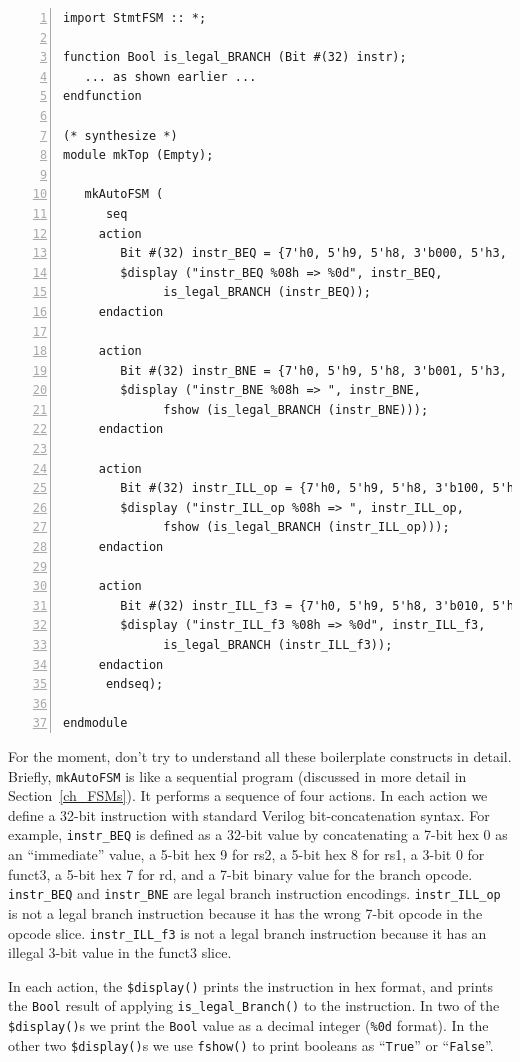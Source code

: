 \begin{minipage}{6.5in}\small
\begin{Verbatim}[frame=single, numbers=left]
import StmtFSM :: *;

function Bool is_legal_BRANCH (Bit #(32) instr);
   ... as shown earlier ...
endfunction

(* synthesize *)
module mkTop (Empty);

   mkAutoFSM (
      seq
	 action
	    Bit #(32) instr_BEQ = {7'h0, 5'h9, 5'h8, 3'b000, 5'h3, 7'b_110_0011};
	    $display ("instr_BEQ %08h => %0d", instr_BEQ,
		      is_legal_BRANCH (instr_BEQ));
	 endaction

	 action
	    Bit #(32) instr_BNE = {7'h0, 5'h9, 5'h8, 3'b001, 5'h3, 7'b_110_0011};
	    $display ("instr_BNE %08h => ", instr_BNE,
		      fshow (is_legal_BRANCH (instr_BNE)));
	 endaction

	 action
	    Bit #(32) instr_ILL_op = {7'h0, 5'h9, 5'h8, 3'b100, 5'h3, 7'b_110_0000};
	    $display ("instr_ILL_op %08h => ", instr_ILL_op,
		      fshow (is_legal_BRANCH (instr_ILL_op)));
	 endaction

	 action
	    Bit #(32) instr_ILL_f3 = {7'h0, 5'h9, 5'h8, 3'b010, 5'h3, 7'b_110_0011};
	    $display ("instr_ILL_f3 %08h => %0d", instr_ILL_f3,
		      is_legal_BRANCH (instr_ILL_f3));
	 endaction
      endseq);

endmodule
\end{Verbatim}
\end{minipage}

For the moment, don't try to understand all these boilerplate
constructs in detail.  Briefly, \verb|mkAutoFSM| is like a sequential
program (discussed in more detail in Section~\ref{ch_FSMs}).  It
performs a sequence of four actions.  In each action we define a
32-bit instruction with standard Verilog bit-concatenation syntax.
For example, \verb|instr_BEQ| is defined as a 32-bit value by
concatenating a 7-bit hex 0 as an ``immediate'' value, a 5-bit hex 9
for rs2, a 5-bit hex 8 for rs1, a 3-bit 0 for funct3, a 5-bit hex 7
for rd, and a 7-bit binary value for the branch opcode.
\verb|instr_BEQ| and \verb|instr_BNE| are legal branch instruction
encodings.  \verb|instr_ILL_op| is not a legal branch instruction
because it has the wrong 7-bit opcode in the opcode slice.
\verb|instr_ILL_f3| is not a legal branch instruction because it has
an illegal 3-bit value in the funct3 slice.

In each action, the \verb|$display()| prints the instruction in hex
format, and prints the \verb|Bool| result of applying
\verb|is_legal_Branch()| to the instruction.  In two of the
\verb|$display()|s we print the \verb|Bool| value as a decimal integer
(\verb|%0d| format).  In the other two \verb|$display()|s we use
\verb|fshow()| to print booleans as ``\verb|True|'' or
``\verb|False|''.

